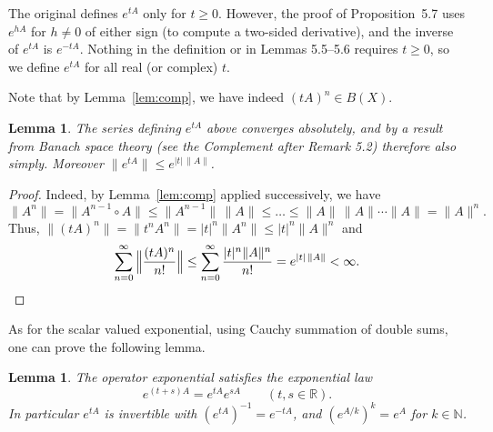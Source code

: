 \documentclass[11pt,a4paper]{article}
\numberwithin{equation}{section}
\newcommand{\N}{\mathbb{N}}
\newcommand{\R}{\mathbb{R}}
\theoremstyle{plain}
\newtheorem{lemma}[theorem]{Lemma}
\theoremstyle{definition}
\theoremstyle{plain}
\theoremstyle{definition}
\begin{document}
\begin{correction}[(Def.~5.4)]
The original defines $e^{tA}$ only for $t\ge0$. However, the proof of Proposition~5.7 uses
$e^{hA}$ for $h\ne0$ of either sign (to compute a two-sided derivative), and the inverse of
$e^{tA}$ is $e^{-tA}$. Nothing in the definition or in Lemmas 5.5--5.6 requires $t\ge0$, so
we define $e^{tA}$ for all real (or complex) $t$.
\end{correction}

Note that by Lemma~\ref{lem:comp}, we have indeed $(tA)^n\in B(X)$.

\begin{lemma}\label{lem:abs}
The series defining $e^{tA}$ above converges absolutely, and by a result from Banach space
theory (see the Complement after Remark 5.2) therefore also simply.
Moreover $\|e^{tA}\|\le e^{|t|\,\|A\|}$.
\end{lemma}
\begin{proof}
Indeed, by Lemma~\ref{lem:comp} applied successively, we have
\[
\|A^n\|=\|A^{n-1}\circ A\|\le\|A^{n-1}\|\,\|A\|\le\dots\le\|A\|\,\|A\|\cdots\|A\|=\|A\|^n.
\]
Thus, $\|(tA)^n\|=\|t^nA^n\|=|t|^n\|A^n\|\le|t|^n\|A\|^n$ and
\[
\sum_{n=0}^\infty\Big\|\frac{(tA)^n}{n!}\Big\|\le\sum_{n=0}^\infty\frac{|t|^n\|A\|^n}{n!}=e^{|t|\,\|A\|}<\infty .\qedhere
\]
\end{proof}

As for the scalar valued exponential, using Cauchy summation of double sums, one can prove
the following lemma.

\begin{lemma}\label{lem:explaw}
The operator exponential satisfies the exponential law
\[
e^{(t+s)A}=e^{tA}e^{sA}\qquad(t,s\in\R).
\]
In particular $e^{tA}$ is invertible with $(e^{tA})^{-1}=e^{-tA}$, and $(e^{A/k})^k=e^A$ for $k\in\N$.
\end{lemma}
\end{document}
